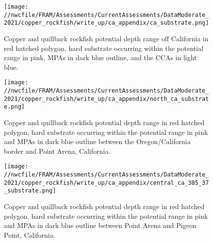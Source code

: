 \documentclass[11pt,
  english,
  a4paper,
]{article}
\begin{document}

\begin{figure}
\centering
\texttt{[image: //nwcfile/FRAM/Assessments/CurrentAssessments/DataModerate\_2021/copper\_rockfish/write\_up/ca\_appendix/ca\_substrate.png]}
\caption{Copper and quillback rockfish potential depth range off California in red hatched polygon, hard substrate occurring within the potential range in pink, MPAs in dark blue outline, and the CCAs in light blue.\label{fig:ca-all-app}}
\end{figure}

\tagmcend\tagstructend


\begin{figure}
\centering
\texttt{[image: //nwcfile/FRAM/Assessments/CurrentAssessments/DataModerate\_2021/copper\_rockfish/write\_up/ca\_appendix/north\_ca\_substrate.png]}
\caption{Copper and quillback rockfish potential depth range in red hatched polygon, hard substrate occurring within the potential range in pink and MPAs in dark blue outline between the Oregon/California border and Point Arena, California.\label{fig:north-ca-app}}
\end{figure}

\tagmcend\tagstructend


\begin{figure}
\centering
\texttt{[image: //nwcfile/FRAM/Assessments/CurrentAssessments/DataModerate\_2021/copper\_rockfish/write\_up/ca\_appendix/central\_ca\_385\_37\_substrate.png]}
\caption{Copper and quillback rockfish potential depth range in red hatched polygon, hard substrate occurring within the potential range in pink and MPAs in dark blue outline between Point Arena and Pigeon Point, California.\label{fig:central-ca-north-app}}
\end{figure}
\end{document}
